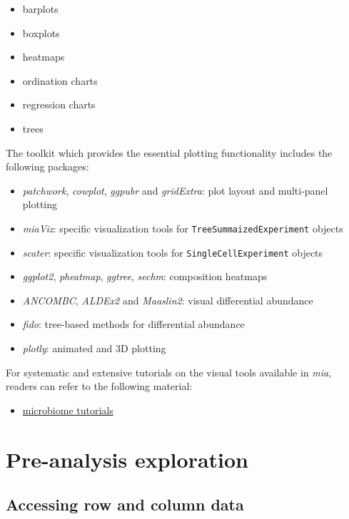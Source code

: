 \documentclass[
]{book}
\providecommand{\tightlist}{%
  \setlength{\itemsep}{0pt}\setlength{\parskip}{0pt}}
\begin{document}
\begin{itemize}
\tightlist
\item
  barplots
\item
  boxplots
\item
  heatmaps
\item
  ordination charts
\item
  regression charts
\item
  trees
\end{itemize}

The toolkit which provides the essential plotting functionality
includes the following packages:

\begin{itemize}
\tightlist
\item
  \emph{patchwork}, \emph{cowplot}, \emph{ggpubr} and \emph{gridExtra}: plot layout and multi-panel plotting
\item
  \emph{miaViz}: specific visualization tools for \texttt{TreeSummaizedExperiment} objects
\item
  \emph{scater}: specific visualization tools for \texttt{SingleCellExperiment} objects
\item
  \emph{ggplot2}, \emph{pheatmap}, \emph{ggtree}, \emph{sechm}: composition heatmaps
\item
  \emph{ANCOMBC}, \emph{ALDEx2} and \emph{Maaslin2}: visual differential abundance
\item
  \emph{fido}: tree-based methods for differential abundance
\item
  \emph{plotly}: animated and 3D plotting
\end{itemize}

For systematic and extensive tutorials on the visual tools available
in \emph{mia}, readers can refer to the following material:

\begin{itemize}
\tightlist
\item
  \href{https://microbiome.github.io/tutorials/}{microbiome tutorials}
\end{itemize}

\hypertarget{pre-analysis-exploration}{%
\section{Pre-analysis exploration}\label{pre-analysis-exploration}}

\hypertarget{accessing-row-and-column-data}{%
\subsection{Accessing row and column data}\label{accessing-row-and-column-data}}
\end{document}
